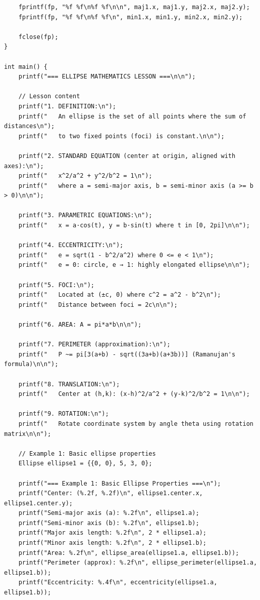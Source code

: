 \documentclass[a4paper,10pt]{article}
\begin{document}
{\begin{verbatim}
    fprintf(fp, "%f %f\n%f %f\n\n", maj1.x, maj1.y, maj2.x, maj2.y);
    fprintf(fp, "%f %f\n%f %f\n", min1.x, min1.y, min2.x, min2.y);

    fclose(fp);
}

int main() {
    printf("=== ELLIPSE MATHEMATICS LESSON ===\n\n");

    // Lesson content
    printf("1. DEFINITION:\n");
    printf("   An ellipse is the set of all points where the sum of distances\n");
    printf("   to two fixed points (foci) is constant.\n\n");

    printf("2. STANDARD EQUATION (center at origin, aligned with axes):\n");
    printf("   x^2/a^2 + y^2/b^2 = 1\n");
    printf("   where a = semi-major axis, b = semi-minor axis (a >= b > 0)\n\n");

    printf("3. PARAMETRIC EQUATIONS:\n");
    printf("   x = a·cos(t), y = b·sin(t) where t in [0, 2pi]\n\n");

    printf("4. ECCENTRICITY:\n");
    printf("   e = sqrt(1 - b^2/a^2) where 0 <= e < 1\n");
    printf("   e = 0: circle, e → 1: highly elongated ellipse\n\n");

    printf("5. FOCI:\n");
    printf("   Located at (±c, 0) where c^2 = a^2 - b^2\n");
    printf("   Distance between foci = 2c\n\n");

    printf("6. AREA: A = pi*a*b\n\n");

    printf("7. PERIMETER (approximation):\n");
    printf("   P ~= pi[3(a+b) - sqrt((3a+b)(a+3b))] (Ramanujan's formula)\n\n");

    printf("8. TRANSLATION:\n");
    printf("   Center at (h,k): (x-h)^2/a^2 + (y-k)^2/b^2 = 1\n\n");

    printf("9. ROTATION:\n");
    printf("   Rotate coordinate system by angle theta using rotation matrix\n\n");

    // Example 1: Basic ellipse properties
    Ellipse ellipse1 = {{0, 0}, 5, 3, 0};

    printf("=== Example 1: Basic Ellipse Properties ===\n");
    printf("Center: (%.2f, %.2f)\n", ellipse1.center.x, ellipse1.center.y);
    printf("Semi-major axis (a): %.2f\n", ellipse1.a);
    printf("Semi-minor axis (b): %.2f\n", ellipse1.b);
    printf("Major axis length: %.2f\n", 2 * ellipse1.a);
    printf("Minor axis length: %.2f\n", 2 * ellipse1.b);
    printf("Area: %.2f\n", ellipse_area(ellipse1.a, ellipse1.b));
    printf("Perimeter (approx): %.2f\n", ellipse_perimeter(ellipse1.a, ellipse1.b));
    printf("Eccentricity: %.4f\n", eccentricity(ellipse1.a, ellipse1.b));


\end{verbatim}}
\end{document}
